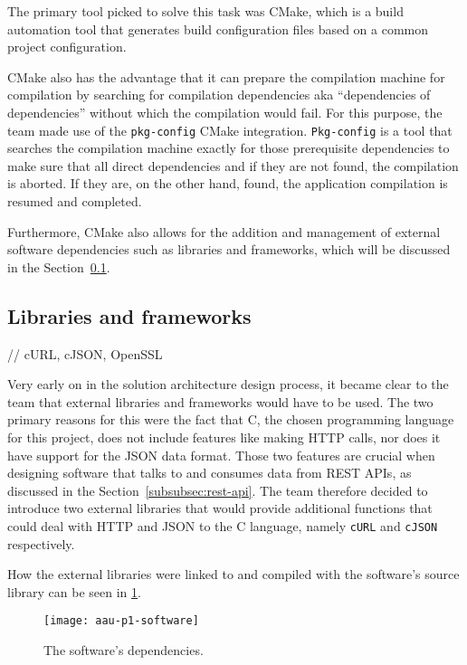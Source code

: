 The primary tool picked to solve this task was CMake, which is a build automation tool that generates build
configuration files based on a common project configuration.

CMake also has the advantage that it can prepare the compilation machine for compilation by searching for compilation
dependencies aka ``dependencies of dependencies'' without which the compilation would fail.
For this purpose, the team made use of the \lstinline{pkg-config} CMake integration.
\lstinline{Pkg-config} is a tool that searches the compilation machine exactly for those prerequisite dependencies to
make sure that all direct dependencies and if they are not found, the compilation is aborted.
If they are, on the other hand, found, the application compilation is resumed and completed.

Furthermore, CMake also allows for the addition and management of external software dependencies such as libraries
and frameworks, which will be discussed in the Section~\ref{subsec:libraries-and-frameworks}.

\subsection{Libraries and frameworks}\label{subsec:libraries-and-frameworks}

// cURL, cJSON, OpenSSL

Very early on in the solution architecture design process, it became clear to the team that external libraries and
frameworks would have to be used.
The two primary reasons for this were the fact that C, the chosen programming language for this project, does not
include features like making HTTP calls, nor does it have support for the JSON data format.
Those two features are crucial when designing software that talks to and consumes data from REST APIs, as discussed
in the Section~\ref{subsubsec:rest-api}.
The team therefore decided to introduce two external libraries that would provide additional functions that could
deal with HTTP and JSON to the C language, namely \lstinline{cURL} and \lstinline{cJSON} respectively.

How the external libraries were linked to and compiled with the software's source library can be seen in
\ref{fig:figure10}.


\begin{figure}
    \centering
    \caption{The software's dependencies.}
    \texttt{[image: aau-p1-software]}
    \label{fig:figure10}
\end{figure}

